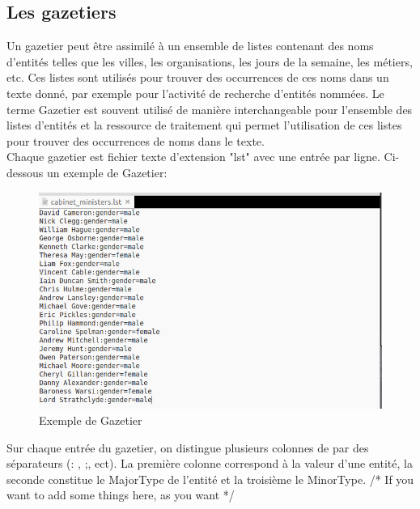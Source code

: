 \documentclass[a4paper, 11pt]{report}
\begin{document}
\subsection{Les gazetiers}
Un gazetier peut être assimilé à un ensemble de listes contenant des noms d'entités telles que les villes, les organisations, les jours de la semaine, les métiers, etc. Ces listes sont utilisés pour trouver des occurrences de ces noms dans un texte donné, par exemple pour l'activité de recherche d'entités nommées. Le terme Gazetier est souvent utilisé de manière interchangeable pour l'ensemble des listes d'entités et la ressource de traitement qui permet l'utilisation de ces listes pour trouver des occurrences de noms dans le texte.\\ Chaque gazetier est fichier texte d'extension "lst" avec une entrée par ligne. %
Ci-dessous un exemple de Gazetier:
\begin{figure}[h]
\begin{center}
\includegraphics[scale=0.3]{img/exGazetier.png}
\end{center}
\caption{Exemple de Gazetier}
\end{figure}
Sur chaque entrée du gazetier, on distingue plusieurs colonnes de par des séparateurs (: , ;, ect). La première colonne correspond à la valeur d'une entité, la seconde constitue le MajorType de l'entité et la troisième le MinorType.
 /* If you want to add some things here, as you want */
\end{document}
